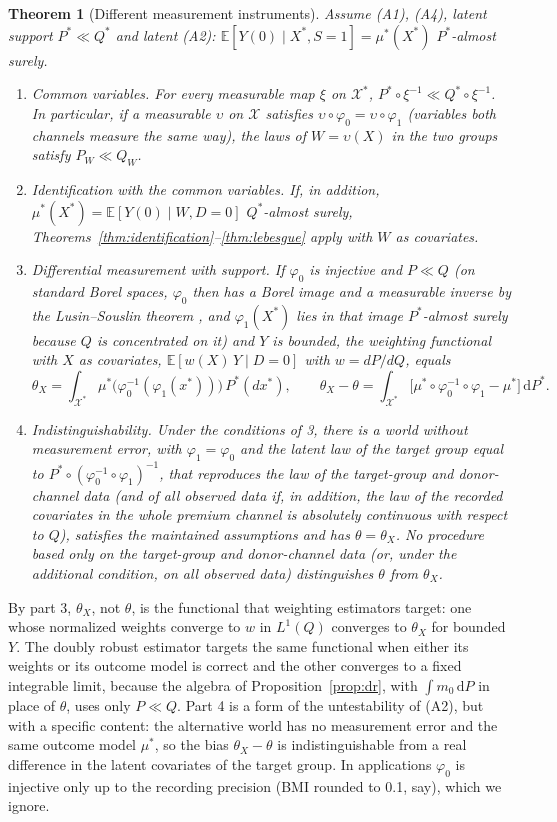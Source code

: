 \documentclass[twoside,11pt]{article}
\newcommand{\E}{\mathbb{E}}
\newcommand{\X}{\mathcal{X}}
\newcommand{\dd}{\,\mathrm{d}}
\theoremstyle{plain}
\newtheorem{theorem}{Theorem}
\theoremstyle{definition}
\begin{document}
\begin{theorem}[Different measurement instruments]\label{thm:measurement}
Assume (A1), (A4), latent support $P^*\ll Q^*$ and latent (A2): $\E[Y(0)\mid X^*,S=1]=\mu^*(X^*)$ $P^*$-almost surely.
\begin{enumerate}
  \item \emph{Common variables.} For every measurable map $\xi$ on $\X^*$, $P^*\circ\xi^{-1}\ll Q^*\circ\xi^{-1}$. In particular, if a measurable $\upsilon$ on $\X$ satisfies $\upsilon\circ\varphi_0=\upsilon\circ\varphi_1$ (variables both channels measure the same way), the laws of $W=\upsilon(X)$ in the two groups satisfy $P_W\ll Q_W$.
  \item \emph{Identification with the common variables.} If, in addition, $\mu^*(X^*)=\E[Y(0)\mid W,D=0]$ $Q^*$-almost surely, Theorems~\ref{thm:identification}--\ref{thm:lebesgue} apply with $W$ as covariates.
  \item \emph{Differential measurement with support.} If $\varphi_0$ is injective and $P\ll Q$ (on standard Borel spaces, $\varphi_0$ then has a Borel image and a measurable inverse by the Lusin--Souslin theorem \citep[Corollary 15.2]{kechris1995}, and $\varphi_1(X^*)$ lies in that image $P^*$-almost surely because $Q$ is concentrated on it) and $Y$ is bounded, the weighting functional with $X$ as covariates, $\E[w(X)\,Y\mid D=0]$ with $w=dP/dQ$, equals
  \[
  \theta_X=\int_{\X^*}\mu^*\bigl(\varphi_0^{-1}(\varphi_1(x^*))\bigr)\,P^*(dx^*),\qquad
  \theta_X-\theta=\int_{\X^*}\bigl[\mu^*\circ\varphi_0^{-1}\circ\varphi_1-\mu^*\bigr]\dd P^*.
  \]
  \item \emph{Indistinguishability.} Under the conditions of 3, there is a world without measurement error, with $\varphi_1=\varphi_0$ and the latent law of the target group equal to $P^*\circ(\varphi_0^{-1}\circ\varphi_1)^{-1}$, that reproduces the law of the target-group and donor-channel data (and of all observed data if, in addition, the law of the recorded covariates in the whole premium channel is absolutely continuous with respect to $Q$), satisfies the maintained assumptions and has $\theta=\theta_X$. No procedure based only on the target-group and donor-channel data (or, under the additional condition, on all observed data) distinguishes $\theta$ from $\theta_X$.
\end{enumerate}
\end{theorem}

By part 3, $\theta_X$, not $\theta$, is the functional that weighting estimators target: one whose normalized weights converge to $w$ in $L^1(Q)$ converges to $\theta_X$ for bounded $Y$. The doubly robust estimator targets the same functional when either its weights or its outcome model is correct and the other converges to a fixed integrable limit, because the algebra of Proposition~\ref{prop:dr}, with $\int m_0\dd P$ in place of $\theta$, uses only $P\ll Q$. Part 4 is a form of the untestability of (A2), but with a specific content: the alternative world has no measurement error and the same outcome model $\mu^*$, so the bias $\theta_X-\theta$ is indistinguishable from a real difference in the latent covariates of the target group. In applications $\varphi_0$ is injective only up to the recording precision (BMI rounded to 0.1, say), which we ignore.
\end{document}
